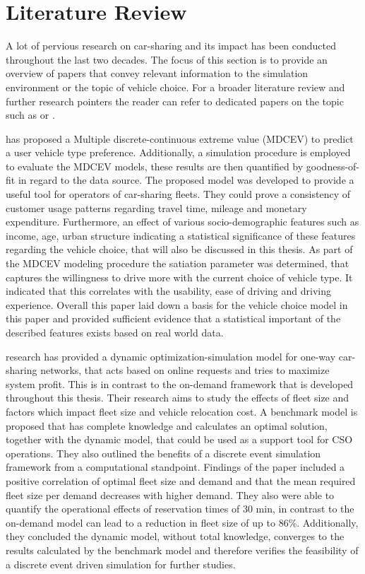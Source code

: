 \clearpage
\section{Literature Review}
\label{sec:lr}

A lot of pervious research on car-sharing and its impact has been conducted throughout
the last two decades. The focus of this section is to provide an overview of papers 
that convey relevant information to the simulation environment or the topic of vehicle
choice. For a broader literature review and further research pointers the reader can 
refer to dedicated papers on the topic such as  or .

 has proposed a Multiple discrete-continuous extreme value (MDCEV) to predict 
a user vehicle type preference. Additionally, a simulation procedure is employed to evaluate the MDCEV
models, these results are then quantified by goodness-of-fit in regard to the data source.
The proposed model was developed to provide a useful tool for operators of car-sharing fleets.
They could prove a consistency of customer usage patterns regarding travel time, mileage and
monetary expenditure. Furthermore, an effect of various socio-demographic features such
as income, age, urban structure indicating a statistical significance of these features
regarding the vehicle choice, that will also be discussed in this thesis.
As part of the MDCEV modeling procedure the satiation parameter was determined, that captures
the willingness to drive more with the current choice of vehicle type. It indicated that this
correlates with the usability, ease of driving and driving experience. Overall this paper
laid down a basis for the vehicle choice model in this paper and provided sufficient evidence that
a statistical important of the described features exists based on real world data.

 research has provided a dynamic optimization-simulation model for 
one-way car-sharing networks, that acts based on
online requests and tries to maximize system profit. This is in contrast to the on-demand
framework that is developed throughout this thesis. Their research aims to study the effects
of fleet size and factors which impact fleet size and vehicle relocation cost. A benchmark
model is proposed that has complete knowledge and calculates an optimal solution, together with
the dynamic model, that could be used as a support tool for CSO operations. They also outlined
the benefits of a discrete event simulation framework from a computational standpoint. Findings
of the paper included a positive correlation of optimal fleet size and demand and that
the mean required fleet size per demand decreases with higher demand. They also were able to
quantify the operational effects of reservation times of 30 min, in contrast to the on-demand
model can lead to a reduction in fleet size of up to 86\%. Additionally, they
concluded the dynamic model, without total knowledge, converges to the results calculated
by the benchmark model and therefore verifies the feasibility of a discrete event driven
simulation for further studies. 

